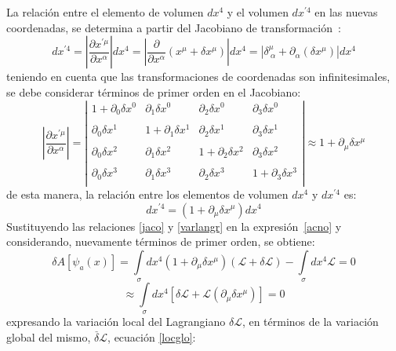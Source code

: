 \documentclass[a4paper,12pt]{article}
\begin{document}
La relación entre el elemento de volumen $dx^{4}$ y el volumen $dx^{'4}$ en las nuevas coordenadas, se determina a partir del Jacobiano de \mbox{transformación \cite{general, noether, greiner}}: 
\begin{equation}
dx^{'4}=\left|\frac{\partial x^{'\mu}}{\partial x^{\alpha}}\right|dx^{4}=\left|\frac{\partial }{\partial x^{\alpha}}(x^{\mu}+\delta x^{\mu})\right|dx^{4}=\left|\delta_{\ \alpha}^\mu+\partial_\alpha(\delta x^{\mu})\right|dx^{4} 
\end{equation}
teniendo en cuenta que las transformaciones de coordenadas son infinitesimales, se debe considerar términos de primer orden en el Jacobiano:
\begin{equation}
\left|\frac{\partial x^{'\mu}}{\partial x^{\alpha}}\right|=\left|\begin{matrix}
1+\partial_0 \delta x^{0} & \partial_1 \delta x^{0} & \partial_2 \delta x^{0} & \partial_3 \delta x^{0}\\
\\ \partial_0 \delta x^{1} & 1+\partial_1 \delta x^{1} & \partial_2 \delta x^{1} & \partial_3 \delta x^{1}\\
\\ \partial_0 \delta x^{2} & \partial_1 \delta x^{2} & 1+\partial_2 \delta x^{2} & \partial_3\delta x^{2}\\
\\ \partial_0 \delta x^{3} & \partial_1\delta x^{3} & \partial_2 \delta x^{3} & 1+\partial_3\delta x^{3}\\
\end{matrix}\right|\approx1+\partial_{\mu} \delta x^\mu  
\end{equation}
de esta manera, la relación entre los elementos de volumen $dx^{4}$ y $dx^{'4}$ es:
\begin{equation} 
dx^{'4}=(1+\partial_{\mu}\delta x^\mu)dx^{4} 
\label{jaco}
\end{equation}
Sustituyendo las relaciones \eqref{jaco} y \eqref{varlangr} en la \mbox{expresión \eqref{acno}} y considerando, nuevamente términos de primer orden, se obtiene: 
\begin{equation}
\delta A[\psi_a (x)]=\int\limits_{\sigma}dx^{4}(1+\partial_{\mu}\delta x^\mu)\left(\mathscr{L}+\delta \mathscr{L} \right)-\int\limits_{\sigma}dx^4\mathscr{L}=0 
\label{lolanglo}           
\end{equation}
$$
\approx\int\limits_{\sigma}dx^{4}[\delta\mathscr{L}+\mathscr{L}(\partial_{\mu}\delta x^\mu)]=0     
$$
expresando la variación local del Lagrangiano $\delta \mathscr{L}$, en términos de la variación global del mismo, $\overset{\_}{\delta}\mathscr{L}$, ecuación \eqref{locglo}:
\end{document}
